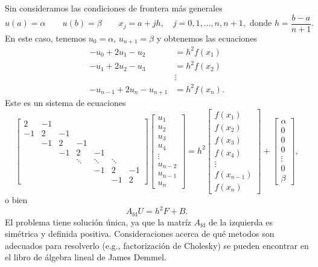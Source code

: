 \documentclass[11pt,letterpaper]{report}
\newcommand\fd{\mathrm{fd}}
\begin{document}
Sin consideramos las condiciones de frontera más generales
\begin{equation}
  u(a)=\alpha
  \qquad u(b)=\beta
  \qquad x_j = a+jh, \quad j=0,1,\dots,n,n+1,
  \text{ donde } h = \frac{b-a}{n+1}
.\end{equation}
En este caso, tenemos $u_0=\alpha$, $u_{n+1}=\beta$ y obtenemos las
ecuaciones
\begin{align}
  -u_0+2u_1-u_2 &= h^{2}f(x_1) \\
  -u_1+2u_2-u_3 &= h^{2}f(x_2) \\
                &\vdots \nonumber \\
  -u_{n-1}+2u_n-u_{n+1} &= h^{2}f(x_n)
.\end{align}
Este es un sistema de ecuaciones
\begin{equation}
  \begin{bmatrix}
    2 & -1 \\
    -1 & 2 & -1 \\
       & -1 & 2 & -1 \\
       & & -1 & 2 & -1 \\
       &&&\ddots &\ddots &\ddots \\
       &&& & -1 & 2 & -1 \\
       &&&& & -1 & 2
  \end{bmatrix}
  \begin{bmatrix}
    u_1 \\ u_2 \\ u_3 \\ u_4 \\ \vdots \\ u_{n-2} \\ u_{n-1} \\ u_n
  \end{bmatrix}
  =
  h^{2}
  \begin{bmatrix}
    f(x_1) \\ f(x_2) \\ f(x_3) \\ f(x_4) \\
    \vdots \\ f(x_{n-1}) \\ f(x_n)
  \end{bmatrix}
  +
  \begin{bmatrix}
    \alpha \\ 0 \\ 0 \\ 0 \\ \vdots \\ 0 \\ \beta
  \end{bmatrix}
,\end{equation}
o bien
\begin{equation}
  A_{\fd}U = h^{2}F + B
.\end{equation}
El problema tiene solución única, ya que la matríz $A_\fd$ de la
izquierda es simétrica y definida positiva. Consideraciones acerca de
qué metodos son adecuados para resolverlo (e.g., factorización de
Cholesky) se pueden encontrar en el libro de álgebra lineal de James
Demmel.
\end{document}

